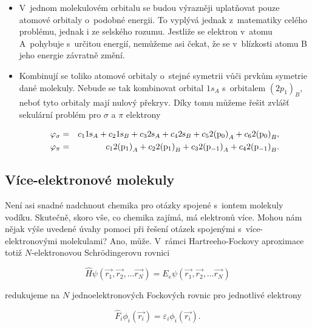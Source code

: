\begin{itemize}
\item V~jednom molekulovém orbitalu se budou výrazněji uplatňovat pouze atomové orbitaly o~podobné energii. To vyplývá jednak z~matematiky celého problému, jednak i ze selského rozumu. Jestliže se elektron v~atomu A~pohybuje s~určitou energií, nemůžeme asi čekat, že se v~blízkosti atomu B jeho energie závratně změní.

\item Kombinují se toliko atomové orbitaly o~stejné symetrii vůči prvkům symetrie dané molekuly. Nebude se tak kombinovat orbital $1s_A$ s~orbitalem $(2p_1)_B$, neboť tyto orbitaly mají nulový překryv. Díky tomu můžeme řešit zvlášť sekulární problém pro $\sigma$ a $\pi$ elektrony

\begin{eqnarray}
\varphi_{\sigma} &=& c_1 1 \mathrm{s}_{A} + c_2 1 \mathrm{s}_{B} + c_3 
2 \mathrm{s}_{A} + c_4 2 \mathrm{s}_{B} + c_5 2 \mathrm{(p_0)}_{A} + c_6 2 \mathrm{(p_0)}_{B}, \nonumber \\
\varphi_{\pi} &=& c_1 2 \mathrm{(p_1)}_{A} + c_2 2 \mathrm{(p_1)}_{B} + c_3 
2 \mathrm{(p_{-1})}_{A} + c_4 2 \mathrm{(p_{-1})}_{B}.
\label{rov:ElStrukt-17}
\end{eqnarray}

\end{itemize}


\subsection{Více-elektronové molekuly}
Není asi snadné nadchnout chemika pro otázky spojené s~iontem molekuly vodíku. Skutečně, skoro vše, co chemika zajímá, má elektronů více. Mohou nám nějak výše uvedené úvahy pomoci při řešení otázek spojenými s~více-elektronovými molekulami? Ano, může. V~rámci Hartreeho-Fockovy aproximace totiž $N$-elektronovou Schr\"odingerovu rovnici 

\begin{equation}
\hat{H} \psi (\vec{r_1}, \vec{r_2}, \dots \vec{r_N}) = E_e\psi (\vec{r_1}, \vec{r_2}, \dots \vec{r_N})
\label{rov:ElStrukt-18}
\end{equation}

\noindent redukujeme na $N$ jednoelektronových Fockových rovnic pro jednotlivé elektrony

\begin{equation}
\hat{F}_i \phi_i (\vec{r_i}) = \varepsilon_i \phi_i (\vec{r_i}).
\label{rov:ElStrukt-19}
\end{equation}

